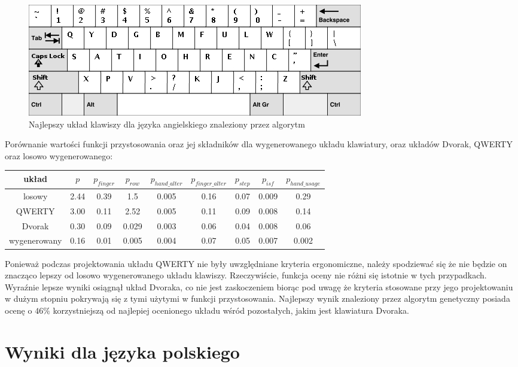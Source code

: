 \documentclass[brudnopis]{xmgr}
\begin{document}
\begin{figure}[!tbh]
\centering
\includegraphics[width=.8\hsize]{fig/best_en}
\caption{Najlepszy układ klawiszy dla języka angielskiego znaleziony przez algorytm}
\end{figure}

Porównanie wartości funkcji przystosowania oraz jej składników dla wygenerowanego układu klawiatury, oraz układów Dvorak, QWERTY oraz losowo wygenerowanego:\newline
\begin{tabular}{ c | c | c | c | c | c | c | c | c }
  układ & $p$ & $p_{finger}$ & $p_{row}$ & $p_{hand\_alter}$ & $p_{finger\_alter}$ & $p_{step}$ & $p_{isf}$ & $p_{hand\_usage}$ \\
  \hline
  losowy       & 2.44 & 0.39 & 1.5 & 0.005 & 0.16 & 0.07 & 0.009 & 0.29 \\
  QWERTY       & 3.00 & 0.11 & 2.52 & 0.005 & 0.11 & 0.09 & 0.008 & 0.14 \\
  Dvorak       & 0.30 & 0.09 & 0.029 & 0.003 & 0.06 & 0.04 & 0.008 & 0.06 \\
  wygenerowany & 0.16 & 0.01 & 0.005 & 0.004 & 0.07 & 0.05 & 0.007 & 0.002 \\
\end{tabular}\newline

Ponieważ podczas projektowania układu QWERTY nie były uwzględniane kryteria ergonomiczne, należy spodziewać się że nie będzie on znacząco lepszy od losowo wygenerowanego układu klawiszy. Rzeczywiście, funkcja oceny nie różni się istotnie w tych przypadkach. Wyraźnie lepsze wyniki osiągnął układ Dvoraka, co nie jest zaskoczeniem biorąc pod uwagę że kryteria stosowane przy jego projektowaniu w dużym stopniu pokrywają się z tymi użytymi w funkcji przystosowania. Najlepszy wynik znaleziony przez algorytm genetyczny posiada ocenę o $46\%$ korzystniejszą od najlepiej ocenionego układu wśród pozostałych, jakim jest klawiatura Dvoraka.


\section{Wyniki dla języka polskiego}
\end{document}
